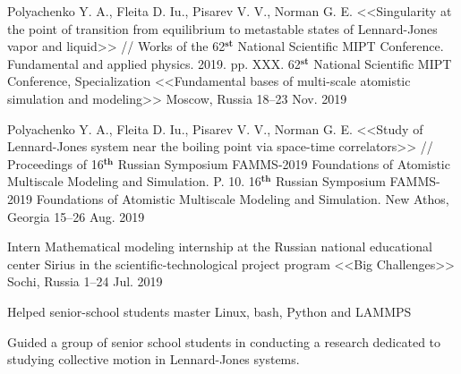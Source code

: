 

\begin{cventries}


  \cventry
    {Polyachenko Y. A., Fleita D. Iu., Pisarev V. V., Norman G. E. <<Singularity at the point of transition from equilibrium to metastable states of Lennard-Jones vapor and liquid>> // Works of the 62$^{\textbf{st}}$ National Scientific MIPT Conference. Fundamental and applied physics. 2019. pp. XXX.} %
    {62$^{\textbf{st}}$ National Scientific MIPT Conference, Specialization <<Fundamental bases of multi-scale atomistic simulation and modeling>>} %
    {Moscow, Russia} %
    {18--23 Nov. 2019} %
    {
      \begin{cvitems} %
      \end{cvitems}
    }


  \cventry
    {Polyachenko Y. A., Fleita D. Iu., Pisarev V. V., Norman G. E. <<Study of Lennard-Jones system near the boiling point via space-time correlators>> // Proceedings of 16$^{\textbf{th}}$ Russian Symposium FAMMS-2019 Foundations of Atomistic Multiscale Modeling and Simulation. P. 10.} %
    {16$^{\textbf{th}}$ Russian Symposium FAMMS-2019 Foundations of Atomistic Multiscale Modeling and Simulation.} %
    {New Athos, Georgia} %
    {15--26 Aug. 2019} %
    {
      \begin{cvitems} %
      \end{cvitems}
    }
    
  \cventry
    {Intern} %
    {Mathematical modeling internship at the Russian national educational center Sirius in the scientific-technological project program <<Big Challenges>>} %
    {Sochi, Russia} %
    {1--24 Jul. 2019} %
    {
      \begin{cvitems} %
        \item {Helped senior-school students master Linux, bash, Python and LAMMPS}
        \item {Guided a group of senior school students in conducting a research dedicated to studying collective motion in Lennard-Jones systems.}
      \end{cvitems}
    }


\end{cventries}

